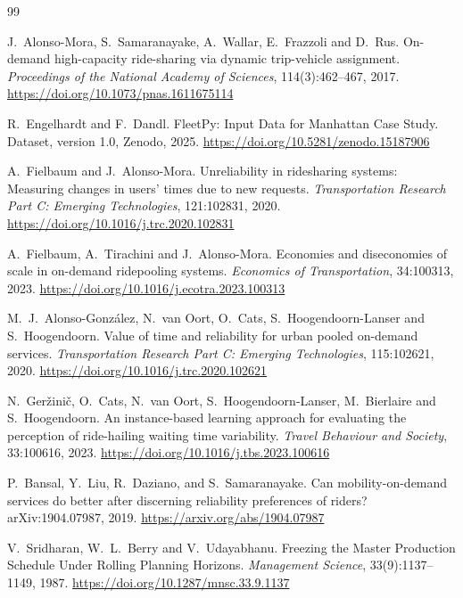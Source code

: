 ﻿\begin{thebibliography}{99}
\setlength{\itemsep}{5pt}
\raggedright

J.~Alonso-Mora, S.~Samaranayake, A.~Wallar, E.~Frazzoli and D.~Rus.
\newblock On-demand high-capacity ride-sharing via dynamic trip-vehicle assignment.
\newblock \emph{Proceedings of the National Academy of Sciences}, 114(3):462--467, 2017.
\newblock \url{https://doi.org/10.1073/pnas.1611675114}

R.~Engelhardt and F.~Dandl.
\newblock FleetPy: Input Data for Manhattan Case Study.
\newblock Dataset, version 1.0, Zenodo, 2025.
\newblock \url{https://doi.org/10.5281/zenodo.15187906}

A.~Fielbaum and J.~Alonso-Mora.
\newblock Unreliability in ridesharing systems: Measuring changes in users’ times due to new requests.
\newblock \emph{Transportation Research Part C: Emerging Technologies}, 121:102831, 2020.
\newblock \url{https://doi.org/10.1016/j.trc.2020.102831}

A.~Fielbaum, A.~Tirachini and J.~Alonso-Mora.
\newblock Economies and diseconomies of scale in on-demand ridepooling systems.
\newblock \emph{Economics of Transportation}, 34:100313, 2023.
\newblock \url{https://doi.org/10.1016/j.ecotra.2023.100313}

M.~J.~Alonso-González, N.~van Oort, O.~Cats, S.~Hoogendoorn-Lanser and S.~Hoogendoorn.
\newblock Value of time and reliability for urban pooled on-demand services.
\newblock \emph{Transportation Research Part C: Emerging Technologies}, 115:102621, 2020.
\newblock \url{https://doi.org/10.1016/j.trc.2020.102621}

N.~Geržinič, O.~Cats, N.~van Oort, S.~Hoogendoorn-Lanser, M.~Bierlaire and S.~Hoogendoorn.
\newblock An instance-based learning approach for evaluating the perception of ride-hailing waiting time variability.
\newblock \emph{Travel Behaviour and Society}, 33:100616, 2023.
\newblock \url{https://doi.org/10.1016/j.tbs.2023.100616}

P.~Bansal, Y.~Liu, R.~Daziano, and S.~Samaranayake.
\newblock Can mobility-on-demand services do better after discerning reliability preferences of
riders?
\newblock arXiv:1904.07987, 2019.
\newblock \url{https://arxiv.org/abs/1904.07987}

V.~Sridharan, W.~L.~Berry and V.~Udayabhanu.
\newblock Freezing the Master Production Schedule Under Rolling Planning Horizons.
\newblock \emph{Management Science}, 33(9):1137--1149, 1987.
\newblock \url{https://doi.org/10.1287/mnsc.33.9.1137}


\end{thebibliography}
